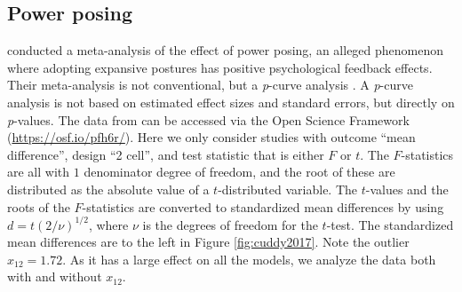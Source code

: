 \documentclass[useAMS,usenatbib,referee]{biom}
\renewcommand{\sqrt}[1]{(#1)^{1/2}}
\begin{document}
\subsection{Power posing\label{subsec:cuddy2018}}

\citet{cuddy2018p} conducted a meta-analysis of the effect of power posing, an alleged phenomenon where adopting expansive postures has positive psychological feedback effects. Their meta-analysis is not conventional, but a \textit{p}-curve analysis \citep{simonsohn2014p}. A \textit{p}-curve analysis is not based on estimated effect sizes and standard errors, but directly on \textit{p}-values. The data from \citet{cuddy2018p} can be accessed via the Open Science Framework (\url{https://osf.io/pfh6r/}). Here we only consider studies with outcome \enquote{mean difference}, design \enquote{2 cell}, and test statistic that is either $F$ or $t$. The $F$-statistics are all with $1$ denominator degree of freedom, and the root of these are distributed as the absolute value of a $t$-distributed variable. The $t$-values and the roots of the $F$-statistics are converted to standardized mean differences by using $d = t\sqrt{2/\nu}$, where $\nu$ is the degrees of freedom for the $t$-test. The standardized mean differences are to the left in Figure \ref{fig:cuddy2017}. Note the outlier $x_{12} = 1.72$. As it has a large effect on all the models, we analyze the data both with and without $x_{12}$.
\end{document}
